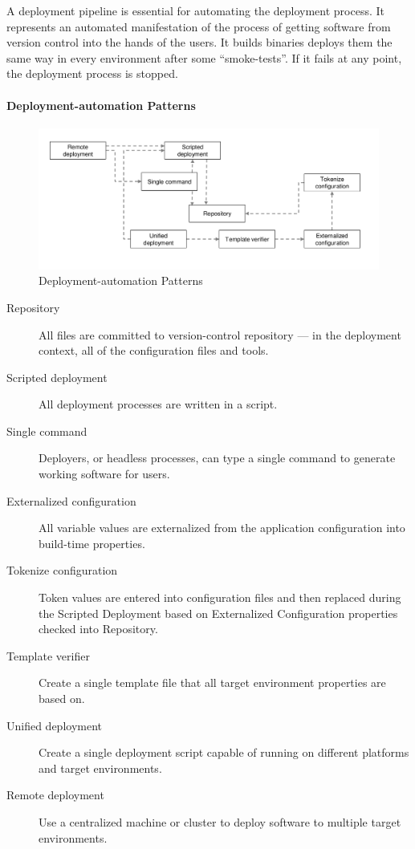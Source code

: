 A deployment pipeline is essential for automating the deployment process.
It represents an automated manifestation of the process of getting software from version control into the hands of the users.
It builds binaries deploys them the same way in every environment after some ``smoke-tests''.
If it fails at any point, the deployment process is stopped.

\paragraph{Deployment-automation Patterns}
\begin{figure}[H]
  \centering
  \includegraphics[width=.8\textwidth]{images/deployment_automation_patterns.png}
  \caption{Deployment-automation Patterns}
\end{figure}
\begin{description}
  \item[Repository] All files are committed to version-control repository — in the deployment context, all of the configuration files and tools.
  \item[Scripted deployment] All deployment processes are written in a script.
  \item[Single command] Deployers, or headless processes, can type a single command to generate working software for users.
  \item[Externalized configuration] All variable values are externalized from the application configuration into build-time properties.
  \item[Tokenize configuration] Token values are entered into configuration files and then replaced during the Scripted Deployment based on Externalized Configuration properties checked into Repository.
  \item[Template verifier] Create a single template file that all target environment properties are based on.
  \item[Unified deployment] Create a single deployment script capable of running on different platforms and target environments.
  \item[Remote deployment] Use a centralized machine or cluster to deploy software to multiple target environments.
\end{description}

